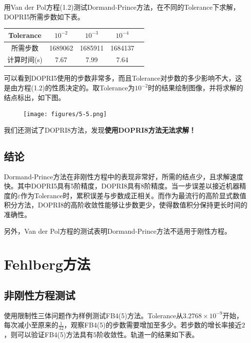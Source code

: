 \documentclass[lang=cn,10pt,bibend=bibtex]{elegantbook}
\begin{document}
用Van der Pol方程(1.2)测试Dormand-Prince方法，在不同的Tolerance下求解，DOPRI5所需步数如下表。

\vspace{-.5em}
\begin{table}[H]
  \centering
  \begin{tabular}{c|cccc}
    Tolerance & $10^{-2}$ & $10^{-3}$ & $10^{-4}$ \\ \hline
    所需步数 & 1689062 & 1685911 & 1684137   \\
    计算时间(s) & 7.67  & 7.99  & 7.64  
  \end{tabular}
\end{table}
\vspace{-.5em}

可以看到DOPRI5使用的步数非常多，而且Tolerance对步数的多少影响不大，这是由方程(1.2)的性质决定的。取Tolerance为$10^{-2}$时的结果绘制图像，并将求解的结点标出，如下图。
\vspace{-.6em}
\begin{figure}[H]
  \centering
  \texttt{[image: figures/5-5.png]}
\end{figure}
\vspace{-.8em}

我们还测试了DOPRI8方法，发现\textbf{使用DOPRI8方法无法求解！}
\vspace{-.6em}
\subsection{结论}

Dormand-Prince方法在非刚性方程中的表现非常好，所需的结点少，且求解速度快。其中DOPRI5具有5阶精度，DOPRI8具有8阶精度。当一步误差以接近机器精度的$\varepsilon$作为Tolerance时，累积误差与步数成正相关。而作为最流行的高阶显式数值积分方法，DOPRI8的高阶收敛性能够让步数更少，使得数值积分保持更长时间的准确性。

另外，Van der Pol方程的测试表明Dormand-Prince方法不适用于刚性方程。
\vspace{-1.5em}

\section{Fehlberg方法}
\vspace{-.7em}

\subsection{非刚性方程测试}

使用限制性三体问题作为样例测试FB4(5)方法。Tolerance从$3.2768\times 10^{-9}$开始，每次减小至原来的$\frac{1}{32}$，观察FB4(5)的步数需要增加至多少。若步数的增长率接近$2$，则可以验证FB4(5)方法具有$5$阶收敛性。轨道一的结果如下表。
\end{document}
